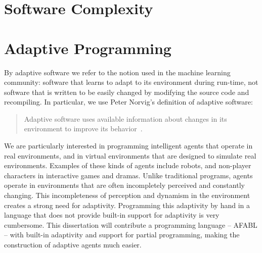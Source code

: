 \cite{hudak1996building}

\cite{lorenz2011a-code}

\cite{taha2008domain-specific}

\cite{deursen2000domain-specific}

\cite{dmitriev2004a-language}

\cite{hudak1998modular}

\cite{spinellis2001notable}

\cite{mitchell1993on-abstraction}

\cite{odersky2008programming}

\cite{simpkins2008towards}

\cite{zang2007towards}

\cite{mernik2005when}

\section{Software Complexity}


\section{Adaptive Programming}

By adaptive software we refer to the notion used in the machine learning community: software that learns to adapt to its environment during run-time, not software that is written to be easily changed by modifying the source code and recompiling.  In particular, we use Peter Norvig's definition of adaptive software:

\begin{quote}
Adaptive software uses available information about changes in its
environment to improve its behavior~\cite{norvig1998adaptive}.
\end{quote}

We are particularly interested in programming intelligent agents that operate in real environments, and in virtual environments that are designed to simulate real environments.  Examples of these kinds of agents include robots, and non-player characters in interactive games and dramas.  Unlike traditional programs, agents operate in environments that are often incompletely perceived and constantly changing.  This incompleteness of perception and dynamism in the environment creates a strong need for adaptivity.  Programming this adaptivity by hand in a language that does not provide built-in support for adaptivity is very cumbersome.  This dissertation will contribute a programming language -- AFABL -- with built-in adaptivity and support for partial programming, making the construction of adaptive agents much easier.

